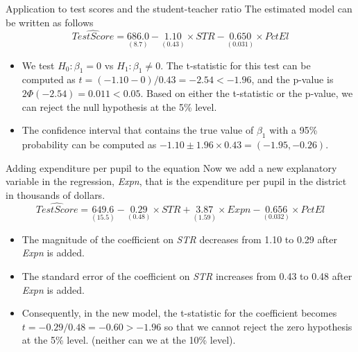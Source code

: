 \documentclass[presentation,10pt]{beamer}
\begin{document}
\begin{frame}[label={sec:org8808665}]{Application to test scores and the student-teacher ratio}
The estimated model can be written as follows
\begin{equation*}
\widehat{TestScore} = \underset{{\displaystyle (8.7)}}{686.0}
- \underset{{\displaystyle (0.43)}}{1.10} \times STR
- \underset{\displaystyle (0.031)}{0.650} \times PctEl
\end{equation*}

\begin{itemize}
\item We test \(H_0: \beta_1 = 0\) vs \(H_1: \beta_1 \neq 0\). The t-statistic
for this test can be computed as \(t = (-1.10-0) / 0.43 = -2.54 <
  -1.96\), and the p-value is \(2\Phi(-2.54) = 0.011 < 0.05\). Based on
either the t-statistic or the p-value, we can reject the null
hypothesis at the 5\% level.

\item The confidence interval that contains the
true value of \(\beta_1\) with a 95\% probability can be computed as
\(-1.10 \pm 1.96 \times 0.43 = (-1.95, -0.26)\).
\end{itemize}
\end{frame}

\begin{frame}[label={sec:orgf33e6c9}]{Adding expenditure per pupil to the equation}
Now we add a new explanatory variable in the regression, \emph{Expn}, that
is the expenditure per pupil in the district in thousands of dollars.
\begin{equation*}
\widehat{TestScore} = \underset{{\displaystyle (15.5)}}{649.6}
- \underset{\displaystyle (0.48)}{0.29} \times STR
+ \underset{\displaystyle (1.59)}{3.87} \times Expn
- \underset{\displaystyle (0.032)}{0.656} \times PctEl
\end{equation*}

\begin{itemize}
\item The magnitude of the coefficient on \emph{STR} decreases from 1.10 to
0.29 after \emph{Expn} is added.
\item The standard error of the coefficient on \emph{STR} increases from 0.43
to 0.48 after \emph{Expn} is added.
\item Consequently, in the new model, the t-statistic for the coefficient
becomes \(t = -0.29/0.48 = -0.60 > -1.96\) so that we cannot reject
the zero hypothesis at the 5\% level. (neither can we at the 10\%
level).
\end{itemize}
\end{frame}
\end{document}
